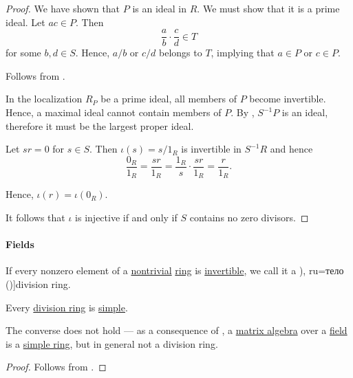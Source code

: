 \begin{proof}
  We have shown that \( P \) is an ideal in \( R \). We must show that it is a prime ideal. Let \( ac \in P \). Then
  \begin{equation*}
    \frac a b \cdot \frac c d \in T
  \end{equation*}
  for some \( b, d \in S \). Hence, \( a / b \) or \( c / d \) belongs to \( T \), implying that \( a \in P \) or \( c \in P \).

   Follows from .

   In the localization \( R_P \) be a prime ideal, all members of \( P \) become invertible. Hence, a maximal ideal cannot contain members of \( P \). By , \( S^{-1} P \) is an ideal, therefore it must be the largest proper ideal.

   Let \( sr = 0 \) for \( s \in S \). Then \( \iota(s) = s / 1_R \) is invertible in \( S^{-1} R \) and hence
  \begin{equation*}
    \frac {0_R} {1_R}
    =
    \frac {sr} {1_R}
    =
    \frac {1_R} s \cdot \frac {sr} {1_R}
    =
    \frac r {1_R}.
  \end{equation*}

  Hence, \( \iota(r) = \iota(0_R) \).

  It follows that \( \iota \) is injective if and only if \( S \) contains no zero divisors.
\end{proof}

\paragraph{Fields}

\begin{definition}\label{def:division_ring}
  If every nonzero element of a \hyperref[def:ring/trivial]{nontrivial} \hyperref[def:ring]{ring} is \hyperref[def:divisibility/invertible]{invertible}, we call it a \term[bg=тяло (\cite[394]{Обрешков1962ВисшаАлгебра}), ru=тело (\cite[def. XI.6.6]{Винберг2014Алгебра})]{division ring}.
\end{definition}

\begin{proposition}\label{thm:division_ring_is_simple}
  Every \hyperref[def:division_ring]{division ring} is \hyperref[def:simple_object]{simple}.
\end{proposition}
\begin{comments}
  \item The converse does not hold --- as a consequence of , a \hyperref[thm:matrix_algebra]{matrix algebra} over a \hyperref[def:field]{field} is a \hyperref[def:simple_object]{simple ring}, but in general not a division ring.
\end{comments}
\begin{proof}
  Follows from .
\end{proof}

